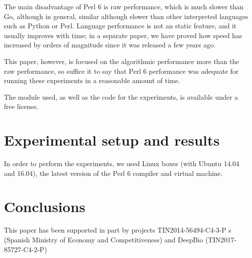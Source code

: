 \documentclass[sigconf]{acmart}
\begin{document}
The main disadvantage of Perl 6 is raw performance, which is much
slower than Go, although in general, similar although slower than
other interpreted languages such as Python or Perl. Language
performance is not an static feature, and it usually improves with
time; in a separate paper, we have proved how speed has increased by
orders of magnitude since it was released a few years ago.

This paper, however, is focused on the algorithmic performance more
than the raw performance, so suffice it to say that Perl 6 performance
was adequate for running these experiments in a reasonable amount of
time.

The module used, as well as the code for the experiments, is available
under a free license. 

\section{Experimental setup and results}
\label{sec:res}

In order to perform the experiments, we used Linux boxes (with Ubuntu
14.04 and 16.04), the latest version of the Perl 6 compiler and
virtual machine. 


\section{Conclusions}
\label{sec:conclusions}

\begin{acks}

  This paper has been supported in part by
projects TIN2014-56494-C4-3-P s (Spanish Ministry of Economy and
Competitiveness) and DeepBio (TIN2017-85727-C4-2-P)


\end{acks}




\end{document}
